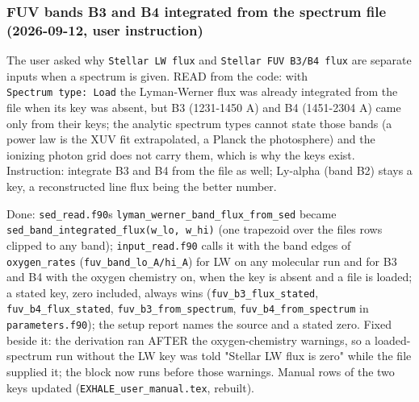 \documentclass[english,a4paper]{my_memo}
\begin{document}
\subsubsection{FUV bands B3 and B4 integrated from the spectrum file (2026-09-12, user instruction)}\label{fuv-bands-b3-and-b4-integrated-from-the-spectrum-file-2026-09-12-user-instruction}

The user asked why \texttt{Stellar\ LW\ flux} and \texttt{Stellar\ FUV\ B3/B4\ flux} are
separate inputs when a spectrum is given. READ from the code: with
\texttt{Spectrum\ type:\ Load} the Lyman-Werner flux was already integrated from the
file when its key was absent, but B3 (1231-1450 A) and B4 (1451-2304 A)
came only from their keys; the analytic spectrum types cannot state those
bands (a power law is the XUV fit extrapolated, a Planck the photosphere)
and the ionizing photon grid does not carry them, which is why the keys
exist. Instruction: integrate B3 and B4 from the file as well; Ly-alpha
(band B2) stays a key, a reconstructed line flux being the better number.

Done: \texttt{sed\_read.f90}\textquotesingle s \texttt{lyman\_werner\_band\_flux\_from\_sed} became
\texttt{sed\_band\_integrated\_flux(w\_lo,\ w\_hi)} (one trapezoid over the file\textquotesingle s rows
clipped to any band); \texttt{input\_read.f90} calls it with the band edges of
\texttt{oxygen\_rates} (\texttt{fuv\_band\_lo\_A/hi\_A}) for LW on any molecular run and for
B3 and B4 with the oxygen chemistry on, when the key is absent and a file
is loaded; a stated key, zero included, always wins (\texttt{fuv\_b3\_flux\_stated},
\texttt{fuv\_b4\_flux\_stated}, \texttt{fuv\_b3\_from\_spectrum}, \texttt{fuv\_b4\_from\_spectrum} in
\texttt{parameters.f90}); the setup report names the source and a stated zero.
Fixed beside it: the derivation ran AFTER the oxygen-chemistry warnings, so
a loaded-spectrum run without the LW key was told "Stellar LW flux is zero"
while the file supplied it; the block now runs before those warnings.
Manual rows of the two keys updated (\texttt{EXHALE\_user\_manual.tex}, rebuilt).
\end{document}
